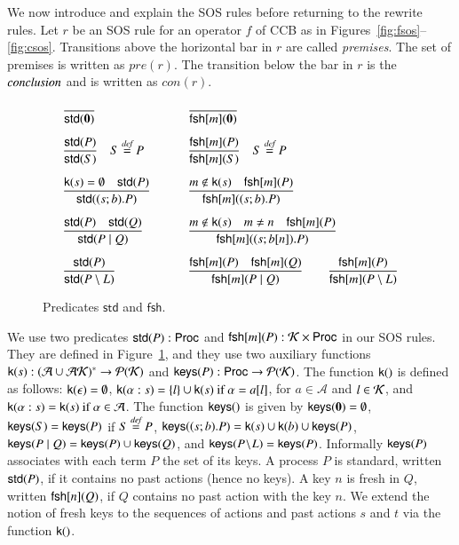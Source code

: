 We now introduce and explain the SOS rules before returning to 
the rewrite rules. Let $r$ be an SOS rule for an operator $f$ of CCB as in 
Figures~\ref{fig:fsos}--\ref{fig:csos}. 
Transitions above the horizontal bar in $r$ are called \emph{premises}. 
The set of premises is written as
$pre(r)$. The transition below the bar in $r$ is the $\emph{conclusion}$ and 
is written as $con(r)$. 
%
\begin{figure}[t] 
\[
\begin{array}{ll}
\displaystyle{\frac{}{\mathsf{std}(\mathbf{0})}}
\qquad &
\displaystyle{\frac{}{\mathsf{fsh}[m](\mathbf{0})}}
\\[15pt]
\displaystyle{\frac{\mathsf{std}(P)}{\mathsf{std}(S)}}
\quad
S \stackrel{\emph{def}}{=} P
\qquad &
\displaystyle{\frac{\mathsf{fsh}[m](P)}{\mathsf{fsh}[m](S)}}
\quad
S \stackrel{\emph{def}}{=} P
\\[15pt]
\displaystyle{\frac{\mathsf{k}(s)=\emptyset \quad  \mathsf{std}(P)}{\mathsf{std}((s;b).P)}}
\qquad &
\displaystyle{\frac{m \notin \mathsf{k}(s) \quad \mathsf{fsh}[m](P)}{\mathsf{fsh}[m]((s;b).P)}}
\\[15pt]
\displaystyle{\frac{\mathsf{std}(P) \quad \mathsf{std}(Q)}{\mathsf{std}(P \; \vert \;Q)}}
\qquad &
\displaystyle{\frac{m \notin \mathsf{k}(s) \quad m \neq n \quad \mathsf{fsh}[m](P)}{\mathsf{fsh}[m]((s;b[n]).P)}}
\\[15pt]
\displaystyle{\frac{\mathsf{std}(P)}{\mathsf{std}(P \setminus L)}}
\qquad &
\displaystyle{\frac{\mathsf{fsh}[m](P) \quad \mathsf{fsh}[m](Q)}{\mathsf{fsh}[m](P \; \vert \;Q)}}
\qquad 
\displaystyle{\frac{\mathsf{fsh}[m](P)}{\mathsf{fsh}[m](P \setminus L)}}
\end{array}
\] 
\caption{Predicates $\mathsf{std}$ and $\mathsf{fsh}$.} 
\label{fig:predicates}
\end{figure}
%
We use two predicates $\mathsf{std}(P):\mathsf{Proc}$ and $\mathsf{fsh}[m](P):\mathcal{K} \times \mathsf{Proc}$ in our SOS rules. 
They are defined in Figure~\ref{fig:predicates}, and they use two auxiliary functions
$\mathsf{k}(s): (\mathcal{A}\cup\mathcal{AK})^* \rightarrow \mathcal{P}(\mathcal{K})$ and
$\mathsf{keys}(P): \mathsf{Proc} \rightarrow \mathcal{P}(\mathcal{K})$. 
The function $\kkey$ is defined as follows:
$\mathsf{k}(\epsilon)=\emptyset$, $\mathsf{k}(\alpha:s)=\{l\}\cup\mathsf{k}(s) \text{ if }\alpha=a[l]$, for 
$a\in \mathcal{A}$ and $l\in \mathcal{K}$, and $\mathsf{k}(\alpha:s)= \mathsf{k}(s) \text{ if }\alpha \in \mathcal{A}$.
The function $\keys$ is given by $\mathsf{keys}(\mathbf{0})=\emptyset$, $\mathsf{keys}(S)=\mathsf{keys}(P)$ if $S\stackrel{\emph{def}}{=} P$, $\mathsf{keys}((s;b).
P)=\mathsf{k}(s) \cup \mathsf{k}(b) \cup \mathsf{keys}(P)$, $\mathsf{keys}(P \; \vert \; Q)= \mathsf{keys}(P) \cup \mathsf{keys}(Q)$, and $\mathsf{keys}(P \!\setminus\!L)=\mathsf{keys}(P)$. Informally $\mathsf{keys}(P)$ associates with each term $P$ the set of its keys. 
A process $P$ is standard, written $\mathsf{std}(P)$, if it contains no past actions (hence no keys). 
A key $n$ is fresh in $Q$, written $\mathsf{fsh}[n](Q)$, if $Q$ contains no past action with the key $n$.
We extend the notion of fresh keys to the sequences of actions and past actions $s$ and $t$ 
via the function $\kkey$.

